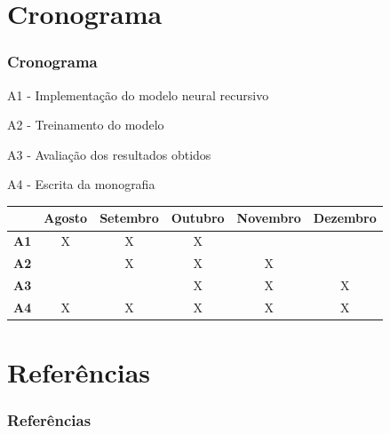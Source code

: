\documentclass[10pt]{beamer}
\begin{document}
\section{Cronograma}

\begin{frame}[fragile]
  \frametitle{Cronograma}

  A1 - Implementação do modelo neural recursivo

  A2 - Treinamento do modelo

  A3 - Avaliação dos resultados obtidos

  A4 - Escrita da monografia

  \begin{table}[!htb]
  \footnotesize
  \centering
  \begin{tabular}{cccccc}
    \toprule
    & \textbf{Agosto} & \textbf{Setembro}  & \textbf{Outubro}  & \textbf{Novembro} & \textbf{Dezembro}  \\
    \midrule
    \textbf{A1} & X & X & X &   &   \\
    \textbf{A2} &   & X & X & X &   \\
    \textbf{A3} &   &   & X & X & X \\
    \textbf{A4} & X & X & X & X & X \\
    \bottomrule
  \end{tabular}
  \end{table}



\end{frame}



\section{Referências}

\begin{frame}

  \frametitle{Referências}
  

\end{frame}




\end{document}
